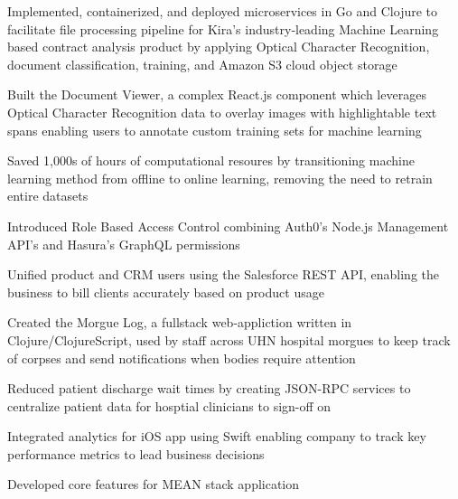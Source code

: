 \documentclass[]{resume}
\begin{document}
\begin{tightemize}
\item Implemented, containerized, and deployed microservices in Go and Clojure to facilitate file processing pipeline for Kira’s industry‑leading Machine Learning based contract analysis product by applying Optical Character Recognition, document classification, training, and Amazon S3 cloud object storage
\item Built the Document Viewer, a complex React.js component which leverages Optical Character Recognition data to overlay images with highlightable text spans enabling users to annotate custom training sets for machine learning
\item Saved 1,000s of hours of computational resoures by transitioning machine learning method from offline to online learning, removing the need to retrain entire datasets
\item Introduced Role Based Access Control combining Auth0's Node.js Management API's and Hasura's GraphQL permissions
\item Unified product and CRM users using the Salesforce REST API, enabling the business to bill clients accurately based on product usage
\end{tightemize}
\separatorM

\begin{tightemize}
\item Created the Morgue Log, a fullstack web-appliction written in Clojure/ClojureScript, used by staff across UHN hospital morgues to keep track of corpses and send notifications when bodies require attention
\item Reduced patient discharge wait times by creating JSON-RPC services to centralize patient data for hosptial clinicians to sign-off on
\end{tightemize}
\separatorM

\begin{tightemize}
\item Integrated analytics for iOS app using Swift enabling company to track key performance metrics to lead business decisions
\item Developed core features for MEAN stack application
\end{tightemize}
 
\end{document}
